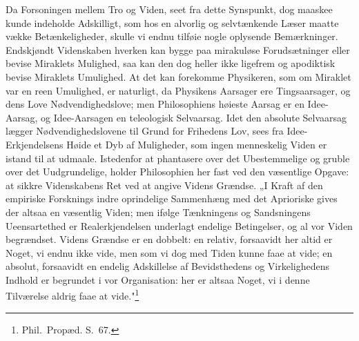 \documentclass[12pt]{book}
\begin{document}
Da Forsoningen mellem Tro og Viden, seet fra dette Synspunkt, dog maaskee kunde
indeholde Adskilligt, som hos en alvorlig og selvtænkende Læser maatte vække
Betænkeligheder, skulle vi endnu tilføie nogle oplysende Bemærkninger. Endskjøndt
Videnskaben hverken kan bygge paa mirakuløse Forudsætninger eller bevise Miraklets
Mulighed, saa kan den dog heller ikke ligefrem og apodiktisk bevise Miraklets
Umulighed. At det kan forekomme Physikeren, som om Miraklet var en reen Umulighed,
er naturligt, da Physikens Aarsager ere Tingsaarsager, og dens Love
Nødvendighedslove; men Philosophiens høieste Aarsag er en Idee-Aarsag, og
Idee-Aarsagen en teleologisk Selvaarsag. Idet den absolute Selvaarsag lægger
Nødvendighedslovene til Grund for Frihedens Lov, sees fra Idee-Erkjendelsens Høide
et Dyb af Muligheder, som ingen menneskelig Viden er istand til at udmaale.
Istedenfor at phantasere over det Ubestemmelige og gruble over det Uudgrundelige,
holder Philosophien her fast ved den væsentlige Opgave: at sikkre Videnskabens Ret
ved at angive Videns Grændse. „I Kraft af den empiriske Forsknings indre
oprindelige Sammenhæng med det Aprioriske gives der altsaa en væsentlig Viden; men
ifølge Tænkningens og Sandsningens Ueensartethed er Realerkjendelsen underlagt
endelige Betingelser, og al vor Viden begrændset. Videns Grændse er en dobbelt: en
relativ, forsaavidt her altid er Noget, vi endnu ikke vide, men som vi dog med
Tiden kunne faae at vide; en absolut, forsaavidt en endelig Adskillelse af
Bevidsthedens og Virkelighedens Indhold er begrundet
i vor Organisation: her er altsaa Noget, vi i denne Tilværelse aldrig faae at
vide."\footnote{Phil.\ Propæd. S.~67.}
\end{document}
